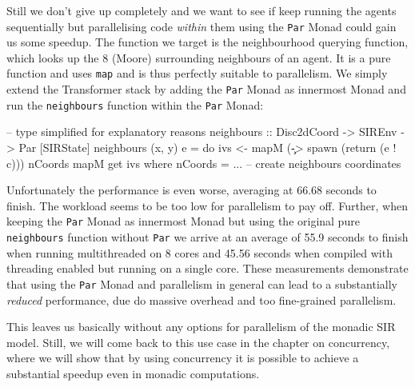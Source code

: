 Still we don't give up completely and we want to see if keep running the agents sequentially but parallelising code \textit{within} them using the \texttt{Par} Monad could gain us some speedup. The function we target is the neighbourhood querying function, which looks up the 8 (Moore) surrounding neighbours of an agent. It is a pure function and uses \texttt{map} and is thus perfectly suitable to parallelism. We simply extend the Transformer stack by adding the \texttt{Par} Monad as innermost Monad and run the \texttt{neighbours} function within the \texttt{Par} Monad:

\begin{HaskellCode}
-- type simplified for explanatory reasons
neighbours :: Disc2dCoord -> SIREnv -> Par [SIRState]
neighbours (x, y) e = do
    ivs <- mapM (\c -> spawn (return (e ! c))) nCoords
    mapM get ivs
  where
    nCoords = ... -- create neighbours coordinates
\end{HaskellCode}

Unfortunately the performance is even worse, averaging at 66.68 seconds to finish. The workload seems to be too low for parallelism to pay off. Further, when keeping the \texttt{Par} Monad as innermost Monad but using the original pure \texttt{neighbours} function without \texttt{Par} we arrive at an average of 55.9 seconds to finish when running multithreaded on 8 cores and 45.56 seconds when compiled with threading enabled but running on a single core. These measurements demonstrate that using the \texttt{Par} Monad and parallelism in general can lead to a substantially \textit{reduced} performance, due do massive overhead and too fine-grained parallelism.

This leaves us basically without any options for parallelism of the monadic SIR model. Still, we will come back to this use case in the chapter on concurrency, where we will show that by using concurrency it is possible to achieve a substantial speedup even in monadic computations.